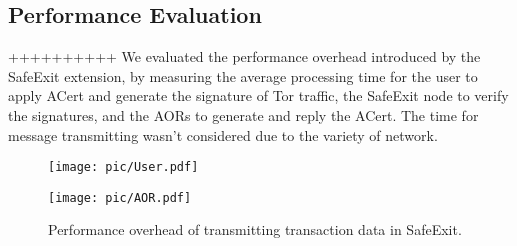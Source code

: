 




\subsection{Performance Evaluation}
++++++++++
We evaluated the performance overhead introduced by the  SafeExit extension, %
 by measuring the average processing time for the user to apply  ACert and generate the signature of Tor traffic,  the SafeExit node to verify the signatures, and the AORs to generate and reply the ACert.
 The time for message transmitting wasn't considered due to the variety of network.

\begin{figure}[bt]
\begin{minipage}[t]{0.5\linewidth}
\centering
  \texttt{[image: pic/User.pdf]}
\end{minipage}%
\begin{minipage}[t]{0.5\linewidth}
\centering
  \texttt{[image: pic/AOR.pdf]}
\end{minipage}
 \caption{Performance overhead of transmitting transaction data  in SafeExit.}\label{pic:eval}
\end{figure}

